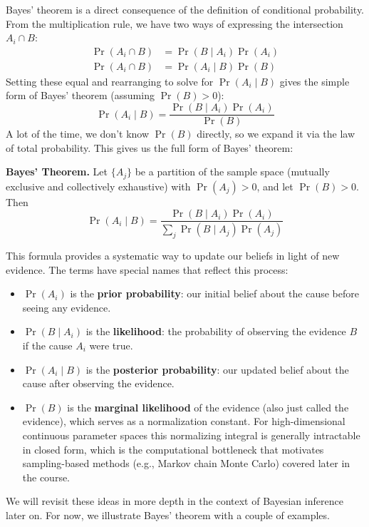 Bayes' theorem is a direct consequence of the definition of conditional probability. From the multiplication rule, we have two ways of expressing the intersection $A_i \cap B$:
\begin{align*}
    \Pr(A_i \cap B) &= \Pr(B \mid A_i)\Pr(A_i) \\
    \Pr(A_i \cap B) &= \Pr(A_i\mid B)\Pr(B)
\end{align*}
Setting these equal and rearranging to solve for $\Pr(A_i \mid B)$ gives the simple form of Bayes' theorem (assuming $\Pr(B)>0$):
\begin{equation}
    \Pr(A_i \mid B) = \frac{\Pr(B \mid A_i)\Pr(A_i)}{\Pr(B)}
    \label{eq:bayes-simple}
\end{equation}
A lot of the time, we don't know $\Pr(B)$ directly, so we expand it via the law of total probability. This gives us the full form of Bayes' theorem:
\begin{definitionBox}
    \textbf{Bayes' Theorem.} Let $\{A_j\}$ be a partition of the sample space (mutually exclusive and collectively exhaustive) with $\Pr(A_j)>0$, and let $\Pr(B)>0$. Then
    \begin{equation}
        \Pr(A_i \mid B) = \frac{\Pr(B \mid A_i)\Pr(A_i)}{\sum_{j} \Pr(B \mid A_j)\Pr(A_j)}
        \label{eq:bayes-full}
    \end{equation}
\end{definitionBox}
This formula provides a systematic way to update our beliefs in light of new evidence. The terms have special names that reflect this process:
\begin{itemize}
    \item $\Pr(A_i)$ is the \textbf{prior probability}: our initial belief about the cause before seeing any evidence.
    \item $\Pr(B \mid A_i)$ is the \textbf{likelihood}: the probability of observing the evidence $B$ if the cause $A_i$ were true.
    \item $\Pr(A_i \mid B)$ is the \textbf{posterior probability}: our updated belief about the cause after observing the evidence.
    \item $\Pr(B)$ is the \textbf{marginal likelihood} of the evidence (also just called the evidence), which serves as a normalization constant. For high-dimensional continuous parameter spaces this normalizing integral is generally intractable in closed form, which is the computational bottleneck that motivates sampling-based methods (e.g., Markov chain Monte Carlo) covered later in the course.
\end{itemize}
We will revisit these ideas in more depth in the context of Bayesian inference later on. For now, we illustrate Bayes' theorem with a couple of examples.

